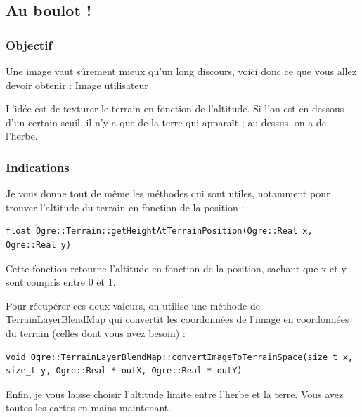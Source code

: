 \subsection{Au boulot !}



\subsubsection{Objectif}

Une image vaut s\^urement mieux qu'un long discours, voici donc ce que vous allez devoir obtenir :
Image utilisateur

L'idée est de texturer le terrain en fonction de l'altitude. Si l'on est en dessous d'un certain seuil, il n'y a que de la terre qui appara\^it ; au-dessus, on a de l'herbe.



\subsubsection{Indications}

Je vous donne tout de même les méthodes qui sont utiles, notamment pour trouver l'altitude du terrain en fonction de la position :

\begin{lstlisting}[caption={méthode getHeightAtTerrainPosition pour trouver l'altitude du terrain en fonction de la position }]
float Ogre::Terrain::getHeightAtTerrainPosition(Ogre::Real x, Ogre::Real y)
\end{lstlisting}

Cette fonction retourne l'altitude en fonction de la position, sachant que x et y sont compris entre 0 et 1.

Pour récupérer ces deux valeurs, on utilise une méthode de TerrainLayerBlendMap qui convertit les coordonnées de l'image en coordonnées du terrain (celles dont vous avez besoin) :

\begin{lstlisting}[caption={Méthode convertImageToTerrainSpace pour convertir les coordonnées de l'image en coordonnées du terrain}]
void Ogre::TerrainLayerBlendMap::convertImageToTerrainSpace(size_t x, size_t y, Ogre::Real * outX, Ogre::Real * outY)
\end{lstlisting}


Enfin, je vous laisse choisir l'altitude limite entre l'herbe et la terre. Vous avez toutes les cartes en mains maintenant.

























